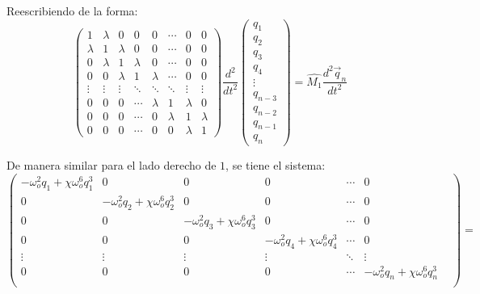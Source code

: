 \documentclass[11pt,letterpaper]{article}
\begin{document}
\par 
Reescribiendo de la forma: 
\begin{equation}
\left(
\begin{matrix}
1 & \lambda  & 0 & 0 & 0 & \cdots & 0 & 0 \\
\lambda & 1 & \lambda  & 0 & 0 & \cdots & 0 & 0\\
0 & \lambda  & 1 & \lambda   & 0 & \cdots & 0& 0 \\
0 & 0 & \lambda  & 1 & \lambda   & \cdots & 0 & 0 \\
\vdots & \vdots & \vdots & \ddots & \ddots & \ddots & \vdots & \vdots \\
0 & 0 & 0 & \cdots & \lambda  &  1 & \lambda &0\\    
0 & 0 & 0 & \cdots & 0 & \lambda  & 1 & \lambda\\    
0 & 0 & 0 & \cdots & 0 & 0 & \lambda  & 1    
\end{matrix} \right) \dfrac{d^2}{dt^2} \left(
\begin{matrix}
q_{1}\\
q_{2}\\
q_{3}\\
q_{4}\\
\vdots\\
q_{n-3}\\
q_{n-2}\\
q_{n-1}\\
q_{n}
\end{matrix} \right)  = \hat{M_{1}} \dfrac{d^{2} \vec{q}_{n}}{dt^{2}}
\end{equation}
\par 
De manera similar para el lado derecho de $1$, se tiene el sistema:  
$$ \left(
\begin{matrix}
- \omega_{o}^{2} q_{1} + \chi \omega_{o}^{6} q_{1}^{3} & 0 & 0 & 0 & \cdots & 0 \\
0  & - \omega_{o}^{2} q_{2} + \chi \omega_{o}^{6} q_{2}^{3} & 0 & 0  & \cdots & 0 \\
0 & 0 & - \omega_{o}^{2} q_{3} + \chi \omega_{o}^{6} q_{3}^{3} & 0 & \cdots & 0 \\
0 & 0 & 0 & - \omega_{o}^{2} q_{4} + \chi \omega_{o}^{6} q_{4}^{3} & \cdots & 0 \\
\vdots & \vdots & \vdots & \vdots & \ddots & \vdots & \\
0 & 0 & 0 & 0& \cdots &- \omega_{o}^{2} q_{n} + \chi \omega_{o}^{6} q_{n}^{3}\\     
\end{matrix} \right) = $$ 
\end{document}
